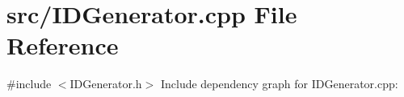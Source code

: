 \section{src/\+I\+D\+Generator.cpp File Reference}
\label{_i_d_generator_8cpp}
{\ttfamily \#include $<$I\+D\+Generator.\+h$>$}\newline
Include dependency graph for I\+D\+Generator.\+cpp\+:
